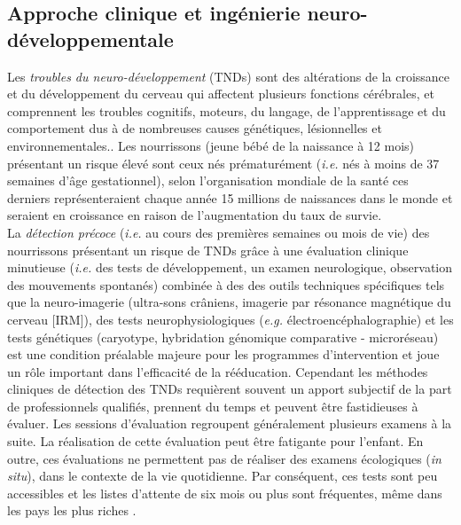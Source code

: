 \documentclass[8pt]{article}
\begin{document}
\subsection{Approche clinique et ingénierie neuro-développementale}
\par Les \textit{troubles du  neuro-développement} (TNDs) sont des altérations de la croissance et du développement du cerveau qui affectent plusieurs fonctions cérébrales, et comprennent les troubles cognitifs, moteurs, du langage, de l'apprentissage et du comportement dus à de nombreuses causes  génétiques, lésionnelles et environnementales.\cite{development_americas_nodate}. Les nourrissons (jeune bébé de la naissance à 12 mois)  présentant un risque élevé sont ceux nés prématurément (\textit{i.e.} nés à moins de 37 semaines d'âge gestationnel)\cite{cecchi_caretoy_2016}, selon l'organisation mondiale de la santé ces derniers représenteraient chaque année 15 millions de naissances dans le monde et seraient en croissance en raison de l'augmentation du taux de survie\cite{blencowe_national_2012}.\\
La \textit{détection précoce} (\textit{i.e.} au cours des premières semaines ou mois de vie) des nourrissons présentant un risque de TNDs grâce à une évaluation clinique minutieuse (\textit{i.e.} des tests de développement, un examen neurologique, observation des mouvements spontanés) combinée à des des outils techniques spécifiques tels que la neuro-imagerie (ultra-sons crâniens, imagerie par résonance magnétique du cerveau [IRM]), des tests neurophysiologiques (\textit{e.g.} électroencéphalographie) et les tests génétiques (caryotype, hybridation génomique comparative - microréseau)\cite{cioni_early_2016}  est une condition préalable majeure pour les programmes d'intervention et joue un rôle important dans l'efficacité de la rééducation\cite{orton_early_2009,spittle_early_2015}. Cependant les méthodes cliniques de détection des TNDs requièrent souvent un apport subjectif de la part de professionnels qualifiés, prennent du temps et peuvent être fastidieuses à évaluer. Les sessions d'évaluation regroupent généralement plusieurs examens à la suite. La réalisation de cette évaluation peut être fatigante pour l'enfant. En outre, ces évaluations ne permettent pas de réaliser des examens écologiques (\textit {in situ}), dans le contexte de la vie quotidienne.  Par conséquent, ces tests sont peu accessibles et les listes d'attente de six mois ou plus sont fréquentes, même dans les pays les plus riches \cite{gargot_automatic_2022}.\\
\end{document}
